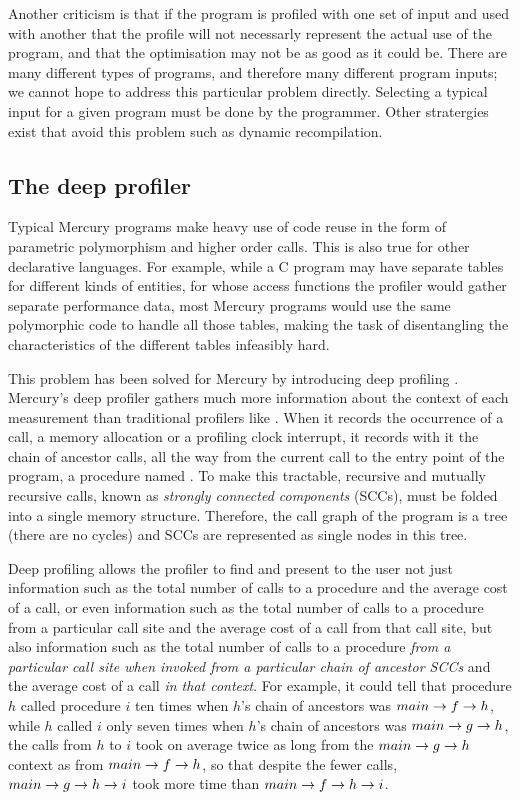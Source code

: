 Another criticism is that if the program is profiled with one set of input and
used with another that the profile will not necessarly represent the actual use
of the program,
and that the optimisation may not be as good as it could be.
There are many different types of programs, and therefore many different
program inputs;
we cannot hope to address this particular problem directly.
Selecting a typical input for a given program must be done by the programmer.
Other stratergies exist that avoid this problem
such as dynamic recompilation.

\subsection{The deep profiler}

Typical Mercury programs make heavy use of code reuse in the form of
parametric polymorphism and higher order calls.
This is also true for other declarative languages.
For example, while a C program may have
separate tables for different kinds of entities,
for whose access functions
the profiler would gather separate performance data,
most Mercury programs would use
the same polymorphic code to handle all those tables,
making the task of disentangling the characteristics of the different tables
infeasibly hard.

This problem has been solved for Mercury by introducing deep profiling
\citep{conway:2001:mercury-deep}.
Mercury's deep profiler gathers much more information about the context of
each measurement than traditional profilers like \cite{gprof}.
When it records the occurrence of a call,
a memory allocation or a profiling clock interrupt,
it records with it the chain of ancestor calls,
all the way from the current call to the entry point of the program,
a procedure named .
To make this tractable,
recursive and mutually recursive calls,
known as \emph{strongly connected components} (SCCs),
must be folded into a single memory structure.
Therefore, the call graph of the program is a tree (there are no cycles)
and SCCs are represented as single nodes in this tree.

Deep profiling allows the profiler to find and present to the user
not just information such as the total number of calls to a procedure
and the average cost of a call,
or even information such as the total number of calls to a procedure
from a particular call site and the average cost of a call from that call site,
but also information such as the total number of calls to a procedure
\emph{from a particular call site
when invoked from a particular chain of ancestor SCCs}
and the average cost of a call \emph{in that context}.
For example, it could tell that
procedure $h$ called procedure $i$ ten times
when $h$'s chain of ancestors was $main \rightarrow f \rightarrow h$,
while $h$ called $i$ only seven times
when $h$'s chain of ancestors was $main \rightarrow g \rightarrow h$,
the calls from $h$ to $i$ took on average twice as long
from the $main \rightarrow g \rightarrow h$ context as from $main \rightarrow f \rightarrow h$,
so that despite the fewer calls,
$main \rightarrow g \rightarrow h \rightarrow i$ took more time than $main \rightarrow f \rightarrow h \rightarrow i$.

